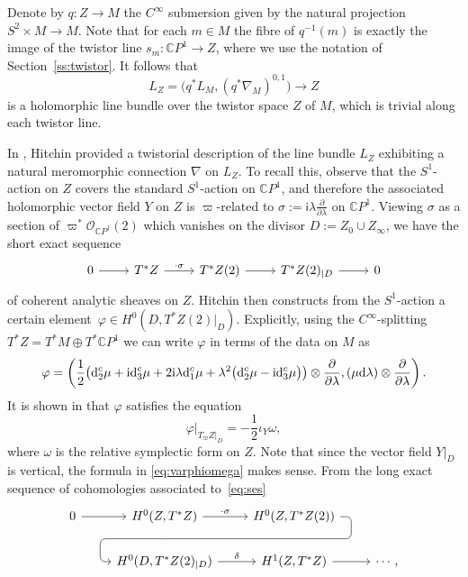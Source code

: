 \documentclass[pdftex]{sigma}
\numberwithin{equation}{section}
\theoremstyle{definition}
\newcommand\C{{\mathbb C}}
\renewcommand{\i}{\mathsf{i}}
\begin{document}
Denote by
$q \colon Z \longrightarrow M$
the $C^\infty$ submersion
given by the natural projection
${S^2 \times M \longrightarrow M}$.
Note that for each $m\in M$ the fibre of $q^{-1}(m)$ is exactly the image of the twistor line ${s_m\colon \C P^1 \longrightarrow Z}$, where we use the notation of Section~\ref{ss:twistor}.
It follows that
\[L_Z = \bigl(q^*L_M, (q^*\nabla_M)^{0,1}\bigr) \longrightarrow Z\]
is a holomorphic line bundle
over the twistor space $Z$ of $M$, which is trivial along each twistor line.


In \cite{Hitchin-HKQK}, Hitchin provided a twistorial description of the line bundle $L_Z$ exhibiting a natural meromorphic connection $\nabla$ on $L_Z$.
To recall this, observe that the $S^1$-action on $Z$ covers the standard $S^1$-action on $\C P^1$, and therefore the associated holomorphic vector field $Y$ on $Z$ is $\varpi$-related to
$
\sigma := \i\lambda\frac{\partial}{\partial\lambda}
$
on $\C P^1$. Viewing $\sigma$ as a section of $\varpi^*{\mathcal O}_{\C P^1}(2)$ which vanishes on the divisor
$D := Z_0\cup Z_\infty$, we have the short exact sequence
\begin{equation}\label{eq:ses}
\begin{tikzcd}
0 \ar[r] & T^*Z \ar[r, "\cdot \sigma"] & T^*Z(2) \ar[r] & T^*Z(2)_{|D} \ar[r] & 0
\end{tikzcd}
\end{equation}
of coherent analytic sheaves on $Z$.
Hitchin then constructs from the $S^1$-action a certain element~$\varphi \in H^0(D, T^*Z(2)|_D)$.
Explicitly, using the $C^\infty$-splitting $T^*Z = T^*M \oplus T^*\C P^1$ we can write $\varphi$ in terms
of the data on $M$ as
\[
\varphi = \left(\frac{1}{2}\big({\rm d}_2^c\mu+{\rm i}{\rm d}_3^c\mu+2{\rm i}\lambda {\rm d}_1^c\mu+\lambda^2\big({\rm d}_2^c\mu- {\rm i} {\rm d}_3^c\mu\big)\big)\otimes \frac{\partial}{\partial \lambda},
 (\mu {\rm d}\lambda) \otimes \frac{\partial}{\partial \lambda} \right) .
\]
It is shown in \cite[Lemma 3.7]{BeHeRo} that $\varphi$ satisfies the equation
\begin{equation}\label{eq:varphiomega}
\varphi\big\vert_{T_\varpi Z|_D} = -\frac{1}{2}\iota_Y\omega,
\end{equation}
where $\omega$ is the relative symplectic form on $Z$. Note that since the vector field $Y|_D$ is vertical, the formula
in \eqref{eq:varphiomega} makes sense. From the long exact sequence of cohomologies associated to~\eqref{eq:ses}
\[
\begin{tikzcd}
0 \ar[r] & H^0(Z,T^*Z) \ar[r, "\cdot \sigma"] \ar[draw=none]{d}[name=X, anchor=center]{} & H^0(Z,T^*Z(2))
\ar[rounded corners, to path={ -- ([xshift=2ex]\tikztostart.east)
 |- (X.center) \tikztonodes
 -| ([xshift=-2ex]\tikztotarget.west)
 -- (\tikztotarget)}]{dl}[at end]{} \\
& H^0(D,T^*Z(2)_{|D}) \ar[r, "\delta"] & H^1(Z,T^*Z)\ar[r]&\cdots,
\end{tikzcd}
\]
\end{document}
